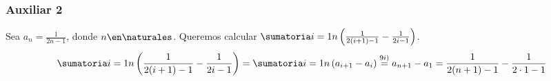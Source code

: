 \begin{enumerate}[label=\roman*)]
	      \subsubsection*{Auxiliar 2}
	      Sea $ a_n = \frac{1}{2n-1}$, donde $n \en \naturales $. Queremos calcular $ \suma1n \left(\frac{1}{2(i+1)-1} - \frac{1}{2i-1}\right)$.
	      \begin{align*}
		      \suma1n \left( \frac{1}{2(i+1)-1} - \frac{1}{2i-1}\right) =
		      \suma1n \left(a_{i+1}- a_i \right) \overset{9i)}=
		      a_{n+1} - a_1 =
		      \frac{1}{2(n+1)-1} - \frac{1}{2\cdot 1-1}
	      \end{align*}
\end{enumerate}
